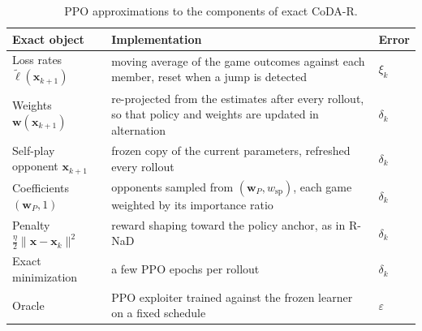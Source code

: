 \documentclass{article} %
\theoremstyle{plain}
\theoremstyle{remark}
\newcommand{\bx}{{\bm{x}}}
\newcommand{\bw}{{\bm{w}}}
\newcommand{\bell}{{\bm{\ell}}}
\newcommand{\aug}{\tilde{\bell}}
\newcommand{\wsp}{w_{\mathrm{sp}}}
\newcommand{\codar}{CoDA-R}
\begin{document}
\begin{table}[!htbp]
\caption{PPO approximations to the components of exact \codar{}.}
\label{tab:impl}
\begin{center}
\footnotesize
\setlength{\tabcolsep}{4pt}
\begin{tabular}{p{3.6cm}p{8.2cm}l}
\toprule
Exact object & Implementation & Error \\
\midrule
Loss rates $\aug(\bx_{k+1})$ & moving average of the game outcomes against each member, reset when a jump is detected & $\xi_k$ \\
Weights $\bw(\bx_{k+1})$ & re-projected from the estimates after every rollout, so that policy and weights are updated in alternation & $\delta_k$ \\
Self-play opponent $\bx_{k+1}$ & frozen copy of the current parameters, refreshed every rollout & $\delta_k$ \\
Coefficients $(\bw_P,1)$ & opponents sampled from $(\bw_P,\wsp)$, each game weighted by its importance ratio & $\delta_k$ \\
Penalty $\tfrac\eta2\|\bx-\bx_k\|^2$ & reward shaping toward the policy anchor, as in R-NaD & $\delta_k$ \\
Exact minimization & a few PPO epochs per rollout & $\delta_k$ \\
Oracle & PPO exploiter trained against the frozen learner on a fixed schedule & $\varepsilon$ \\
\bottomrule
\end{tabular}
\end{center}
\end{table}
\end{document}
